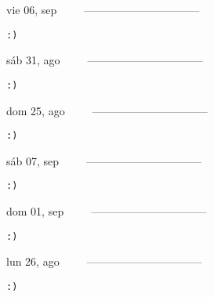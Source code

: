 \documentclass[letterpaper,10pt]{article}
\begin{document}
\begin{multicols}{3}
{vie 06, sep\ \ \ \ \ --------------------------------}
\begin{flushright}\begin{small}\texttt{:)}\end{small}\end{flushright}
\vfill
{sáb 31, ago\ \ \ \ \ --------------------------------}
\begin{flushright}\begin{small}\texttt{:)}\end{small}\end{flushright}\par
\vfill
{dom 25, ago\ \ \ \ \ --------------------------------}
\begin{flushright}\begin{small}\texttt{:)}\end{small}\end{flushright}\par
\vfill
\end{multicols}
\vspace{1.05cm}

\begin{multicols}{3}
{sáb 07, sep\ \ \ \ \ --------------------------------}
\begin{flushright}\begin{small}\texttt{:)}\end{small}\end{flushright}
\vfill
{dom 01, sep\ \ \ \ \ --------------------------------}
\begin{flushright}\begin{small}\texttt{:)}\end{small}\end{flushright}\par
\vfill
{lun 26, ago\ \ \ \ \ --------------------------------}
\begin{flushright}\begin{small}\texttt{:)}\end{small}\end{flushright}\par
\vfill
\end{multicols}
\vspace{1.05cm}
\end{document}
